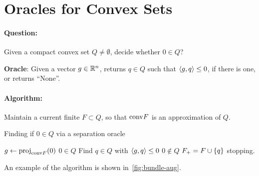 \section{Oracles for Convex Sets}

\paragraph{Question:} Given a compact convex set $Q \neq \emptyset$, decide
whether $0 \in Q$?

\textbf{Oracle}: Given a vector $g \in \mathbb{R}^n$, returns $q \in Q$ such that
$\left\langle g, q \right\rangle \leq 0$, if there is one, or returns ``None''.

\paragraph{Algorithm:} Maintain a current finite $F \subset Q$, so that
$\mathrm{conv}{F}$ is an approximation of $Q$.

\begin{algorithm}
	\caption{Finding if $0 \in Q$ via a separation oracle}
	\begin{algorithmic}
		\Repeat
			\State $g \gets \mathrm{proj}_{\mathrm{conv}{F}}(0)$
				\State \Return $0 \in Q$
			\EndIf
			\State Find $q \in Q$ with $\left\langle g, q \right\rangle \leq 0$
				\State \Return $0 \notin Q$
			\EndIf
			\State $F_+ = F \cup \left\{ q \right\}$
		\Until stopping.
	\end{algorithmic}
	\label{alg:sep-oracle}
\end{algorithm}

An example of the algorithm is shown in~\cref{fig:bundle-aug}.

